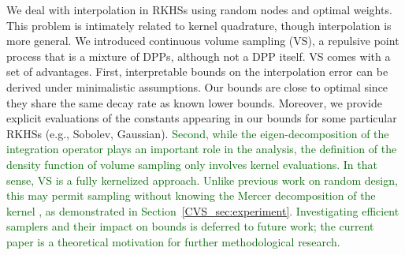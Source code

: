 \documentclass[twoside,11pt]{book}
\newcommand{\rev}[1]{\textcolor{darkgreen}{#1}}
\numberwithin{theorem}{chapter}
\numberwithin{definition}{chapter}
\numberwithin{proposition}{chapter}
\numberwithin{corollary}{chapter}
\numberwithin{example}{chapter}
\numberwithin{lemma}{chapter}
\numberwithin{assumption}{chapter}
\DeclareMathOperator{\X}{\mathcal{X}}
\begin{document}






We deal with interpolation in RKHSs using random nodes and optimal weights. This problem is intimately related to kernel quadrature, though interpolation is more general.
We introduced continuous volume sampling (VS), a repulsive point process that is a mixture of DPPs, although not a DPP itself.
VS comes with a set of advantages. First, interpretable bounds on the interpolation error can be derived under minimalistic assumptions. Our bounds are close to optimal since they share the same decay rate as known lower bounds. Moreover, we provide explicit evaluations of the constants appearing in our bounds for some particular RKHSs (e.g., Sobolev, Gaussian).
\rev{
Second, while the eigen-decomposition of the integration operator plays an important role in the analysis, the definition of the density function of volume sampling only involves kernel evaluations. In that sense, VS is a fully kernelized approach. Unlike previous work on random design, this may permit sampling without knowing the Mercer decomposition of the kernel \citep{ReGh19}, as demonstrated in Section~\ref{CVS_sec:experiment}. Investigating efficient samplers and their impact on bounds is deferred to future work; the current paper is a theoretical motivation for further methodological research.
}
\end{document}
